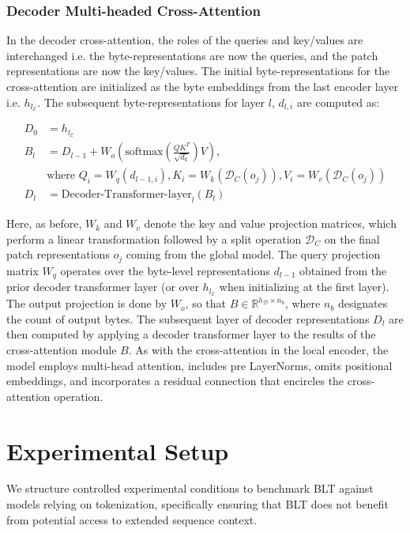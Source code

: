 \subsubsection{Decoder Multi-headed Cross-Attention} 

In the decoder cross-attention, the roles of the queries and key/values are interchanged i.e. the byte-representations are now the queries, and the patch representations are now the key/values. The initial byte-representations for the cross-attention are initialized as the byte embeddings from the last encoder layer i.e. $h_{l_{\mathcal{E}}}$. The subsequent byte-representations for layer $l$, $d_{l,i}$ are computed as:

\begin{align}
D_0 &= h_{l_{\mathcal{E}}} \\
B_l &= D_{l-1} + W_o\left(\text{softmax}\left(\frac{QK^T}{\sqrt{d_k}}\right)V\right), \\
  &\text{where } Q_i = W_q(d_{l-1,i}), K_i = W_k(\mathcal{D}_C(o_j)), V_i = W_v(\mathcal{D}_C(o_j)) \\
  D_l &= \text{Decoder-Transformer-layer}_l(B_l)
\end{align}

Here, as before, $W_k$ and $W_v$ denote the key and value projection matrices, which perform a linear transformation followed by a split operation $\mathcal{D}_C$ on the final patch representations $o_j$ coming from the global model. The query projection matrix $W_q$ operates over the byte-level representations $d_{l-1}$ obtained from the prior decoder transformer layer (or over $h_{l_{\mathcal{E}}}$ when initializing at the first layer). The output projection is done by $W_o$, so that $B \in \mathbb{R}^{h_{\mathcal{D}} \times n_b}$, where $n_b$ designates the count of output bytes. The subsequent layer of decoder representations $D_l$ are then computed by applying a decoder transformer layer to the results of the cross-attention module $B$. As with the cross-attention in the local encoder, the model employs multi-head attention, includes pre LayerNorms, omits positional embeddings, and incorporates a residual connection that encircles the cross-attention operation.

\section{Experimental Setup}
\label{section:experiments}
We structure controlled experimental conditions to benchmark {\textsc BLT} against models relying on tokenization, specifically ensuring that {\textsc BLT} does not benefit from potential access to extended sequence context.

